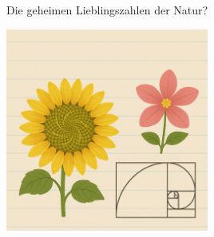 \begin{funfactbox}{Die geheimen Lieblingszahlen der Natur?}
\begin{center}
    \includegraphics[width=0.5\textwidth]{grafiken/Fibonacci_Natur_Collage.png}
    \label{fig:fibonacci_natur_funfact}
\end{center}
\end{funfactbox}